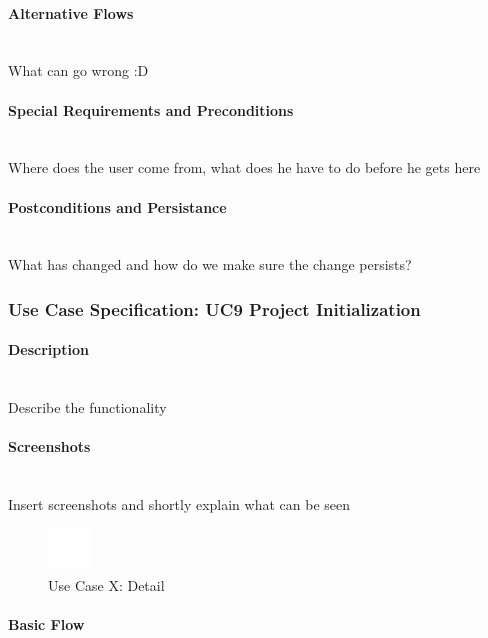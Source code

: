 \paragraph*{Alternative Flows}\mbox{}\\
What can go wrong :D

\paragraph*{Special Requirements and Preconditions}\mbox{}\\
Where does the user come from, what does he have to do before he gets here

\paragraph*{Postconditions and Persistance}\mbox{}\\
What has changed and how do we make sure the change persists?

\newpage
\subsubsection{Use Case Specification: \ac{UC}9 Project Initialization}
\label{sec:domainBbj}

\paragraph*{Description}\mbox{}\\
Describe the functionality

\paragraph*{Screenshots}\mbox{}\\
Insert screenshots and shortly explain what can be seen
\begin{figure}[h] 
	\centering
	\includegraphics[width=0.1\textwidth]{Content/Domain/placeholder.png}
	\caption{Use Case X: Detail}
	\label{fig:label9}
\end{figure}

\paragraph*{Basic Flow} \mbox{}\\


